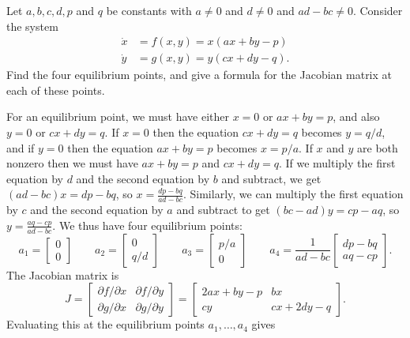 \documentclass[a4paper]{amsart}
\begin{document}
\begin{exercise}\label{ex-general-quadratic}
 Let $a,b,c,d,p$ and $q$ be constants with $a\neq 0$ and $d\neq 0$ and
 $ad-bc\neq 0$.  Consider the system 
 \begin{align*}
  \dot{x} &= f(x,y) = x(ax+by-p) \\
  \dot{y} &= g(x,y) = y(cx+dy-q).
 \end{align*}
 Find the four equilibrium points, and give a formula for the Jacobian
 matrix at each of these points.
\end{exercise}
\begin{solution}
 For an equilibrium point, we must have either $x=0$ or $ax+by=p$, and
 also $y=0$ or $cx+dy=q$.  If $x=0$ then the equation $cx+dy=q$
 becomes $y=q/d$, and if $y=0$ then the equation $ax+by=p$ becomes
 $x=p/a$.  If $x$ and $y$ are both nonzero then we must have $ax+by=p$
 and $cx+dy=q$.  If we multiply the first equation by $d$ and the
 second equation by $b$ and subtract, we get $(ad-bc)x=dp-bq$, so 
 $x=\frac{dp-bq}{ad-bc}$.  Similarly, we can multiply the first
 equation by $c$ and the second equation by $a$ and subtract to get
 $(bc-ad)y=cp-aq$, so $y=\frac{aq-cp}{ad-bc}$.  We thus have
 four equilibrium points:
 \[ a_1 = \left[\begin{array}{cc} 0\\ 0\end{array}\right] \qquad
    a_2 = \left[\begin{array}{cc} 0\\ q/d\end{array}\right] \qquad
    a_3 = \left[\begin{array}{cc} p/a\\ 0\end{array}\right] \qquad
    a_4 = \frac{1}{ad-bc}\left[\begin{array}{cc} dp-bq \\ aq-cp \end{array}\right].
 \]
 The Jacobian matrix is 
 \[ J = \left[\begin{array}{cc} \partial f/\partial x & \partial f/\partial y \\
             \partial g/\partial x & \partial g/\partial y \end{array}\right]
      = \left[\begin{array}{cc} 2ax+by-p & bx \\
             cy & cx+2dy-q \end{array}\right].
 \]
 Evaluating this at the equilibrium points $a_1,\dotsc,a_4$ gives

\end{solution}
\end{document}
